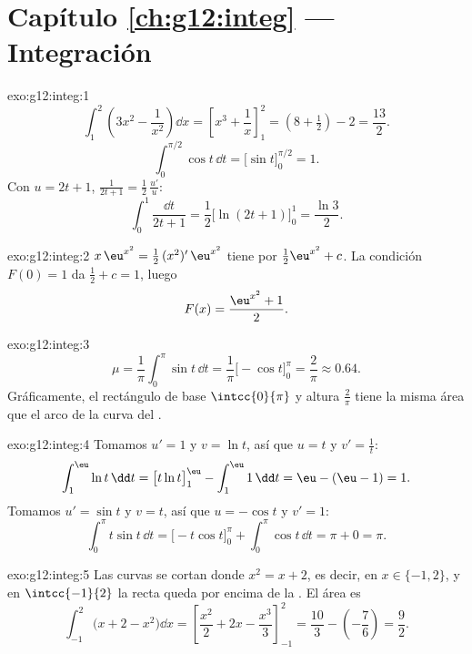 \section*{Capítulo \ref{ch:g12:integ} --- Integración}

\begin{solution}{exo:g12:integ:1}
\[
\int_1^2 \left(3x^2 - \frac{1}{x^2}\right)\dd x
= \left[x^3 + \frac1x\right]_1^2 = \left(8 + \tfrac12\right) - 2 = \frac{13}{2}.
\]
\[
\int_0^{\pi/2} \cos t\,\dd t = \bigl[\sin t\bigr]_0^{\pi/2} = 1 .
\]
Con $u = 2t+1$, $\frac{1}{2t+1} = \frac12\,\frac{u'}{u}$:
\[
\int_0^1 \frac{\dd t}{2t+1} = \frac12\bigl[\ln(2t+1)\bigr]_0^1
= \frac{\ln 3}{2}.
\]
\end{solution}

\begin{solution}{exo:g12:integ:2}
$x\,\eu^{x^2} = \frac12\,(x^2)'\,\eu^{x^2}$ tiene por 
$\frac12\eu^{x^2} + c$. La condición $F(0) = 1$ da $\frac12 + c = 1$, luego
\[
F(x) = \frac{\eu^{x^2} + 1}{2}.
\]
\end{solution}

\begin{solution}{exo:g12:integ:3}
\[
\mu = \frac{1}{\pi}\int_0^\pi \sin t\,\dd t
= \frac{1}{\pi}\bigl[-\cos t\bigr]_0^\pi = \frac{2}{\pi} \approx 0.64 .
\]
Gráficamente, el rectángulo de base $\intcc{0}{\pi}$ y altura
$\frac{2}{\pi}$ tiene la misma área que el arco de la curva del .
\end{solution}

\begin{solution}{exo:g12:integ:4}
Tomamos $u' = 1$ y $v = \ln t$, así que $u = t$ y $v' = \frac1t$:
\[
\int_1^{\eu} \ln t\,\dd t = \bigl[t\ln t\bigr]_1^{\eu} - \int_1^{\eu} 1\,\dd t
= \eu - (\eu - 1) = 1 .
\]
Tomamos $u' = \sin t$ y $v = t$, así que $u = -\cos t$ y $v' = 1$:
\[
\int_0^\pi t\sin t\,\dd t = \bigl[-t\cos t\bigr]_0^\pi + \int_0^\pi \cos t\,\dd t
= \pi + 0 = \pi .
\]
\end{solution}

\begin{solution}{exo:g12:integ:5}
Las curvas se cortan donde $x^2 = x + 2$, es decir, en
$x \in \{-1, 2\}$, y en $\intcc{-1}{2}$ la recta queda por encima de la
. El área es
\[
\int_{-1}^{2} \bigl(x + 2 - x^2\bigr)\dd x
= \left[\frac{x^2}{2} + 2x - \frac{x^3}{3}\right]_{-1}^{2}
= \frac{10}{3} - \left(-\frac{7}{6}\right) = \frac{9}{2}.
\]
\end{solution}

